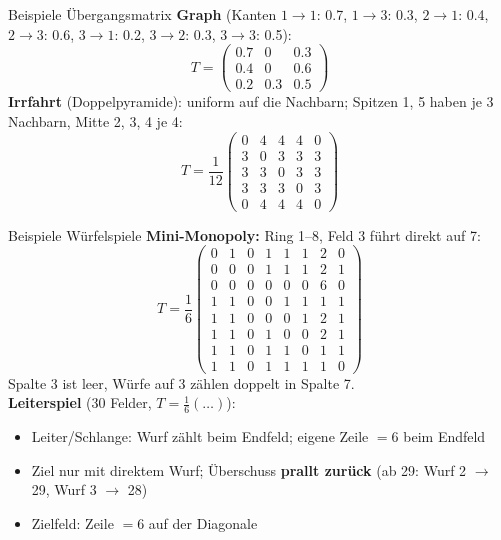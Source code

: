 \documentclass[a4paper, fontsize=7pt]{scrartcl}
\renewcommand*{\arraystretch}{1.5}  %
\begin{document}
\begin{subbox}{Beispiele Übergangsmatrix}
\renewcommand*{\arraystretch}{1.05}
\setlength{\arraycolsep}{3pt}
\textbf{Graph} (Kanten $1 \to 1$: 0.7, $1 \to 3$: 0.3, $2 \to 1$: 0.4, $2 \to 3$: 0.6,
$3 \to 1$: 0.2, $3 \to 2$: 0.3, $3 \to 3$: 0.5):
$$T = \begin{pmatrix} 0.7 & 0 & 0.3\\ 0.4 & 0 & 0.6\\ 0.2 & 0.3 & 0.5 \end{pmatrix}$$
\textbf{Irrfahrt} (Doppelpyramide): uniform auf die Nachbarn; Spitzen 1, 5 haben je
3 Nachbarn, Mitte 2, 3, 4 je 4:
$$T = \frac{1}{12} \begin{pmatrix} 0 & 4 & 4 & 4 & 0\\ 3 & 0 & 3 & 3 & 3\\
3 & 3 & 0 & 3 & 3\\ 3 & 3 & 3 & 0 & 3\\ 0 & 4 & 4 & 4 & 0 \end{pmatrix}$$
\end{subbox}

\begin{subbox}{Beispiele Würfelspiele}
\renewcommand*{\arraystretch}{1.05}
\setlength{\arraycolsep}{3pt}
\textbf{Mini-Monopoly:} Ring 1--8, Feld 3 führt direkt auf 7:
$$T = \frac{1}{6} \begin{pmatrix}
0 & 1 & 0 & 1 & 1 & 1 & 2 & 0\\
0 & 0 & 0 & 1 & 1 & 1 & 2 & 1\\
0 & 0 & 0 & 0 & 0 & 0 & 6 & 0\\
1 & 1 & 0 & 0 & 1 & 1 & 1 & 1\\
1 & 1 & 0 & 0 & 0 & 1 & 2 & 1\\
1 & 1 & 0 & 1 & 0 & 0 & 2 & 1\\
1 & 1 & 0 & 1 & 1 & 0 & 1 & 1\\
1 & 1 & 0 & 1 & 1 & 1 & 1 & 0
\end{pmatrix}$$
Spalte 3 ist leer, Würfe auf 3 zählen doppelt in Spalte 7.\\
\textbf{Leiterspiel} (30 Felder, $T = \frac{1}{6}(\ldots)$):
\begin{itemize}
    \item Leiter/Schlange: Wurf zählt beim Endfeld; eigene Zeile $= 6$ beim Endfeld
    \item Ziel nur mit direktem Wurf; Überschuss \textbf{prallt zurück}
          (ab 29: Wurf 2 $\to$ 29, Wurf 3 $\to$ 28)
    \item Zielfeld: Zeile $= 6$ auf der Diagonale
\end{itemize}
\end{subbox}
\end{document}
